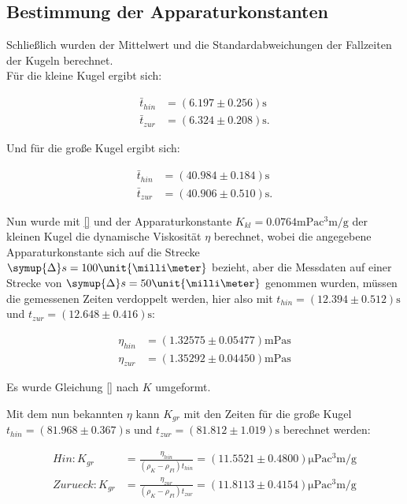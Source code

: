 \subsection{Bestimmung der Apparaturkonstanten}

Schließlich wurden der Mittelwert und die Standardabweichungen der Fallzeiten der Kugeln berechnet.\\
Für die kleine Kugel ergibt sich:

\begin{align*}
  \bar{t}_{hin} &=(6.197\pm 0.256)\unit{\second}\\
  \bar{t}_{zur} &=(6.324\pm 0.208)\unit{\second}.
\end{align*}

Und für die große Kugel ergibt sich:

\begin{align*}
  \bar{t}_{hin} &=(40.984\pm 0.184)\unit{\second}\\
  \bar{t}_{zur} &=(40.906\pm 0.510)\unit{\second}.
\end{align*}

Nun wurde mit \eqref{} und der Apparaturkonstante $K_{kl} = 0.0764\unit{\milli\pascal\cubic\centi\meter\per\gram}$
der kleinen Kugel die dynamische Viskosität $\eta$ berechnet, wobei die angegebene Apparaturkonstante sich auf die Strecke
$\symup{\Delta}s = 100\unit{\milli\meter}$ bezieht, aber die Messdaten auf einer Strecke von $\symup{\Delta}s = 50\unit{\milli\meter}$ genommen wurden,
müssen die gemessenen Zeiten verdoppelt werden, hier also mit $t_{hin} = (12.394\pm 0.512)\unit{\second}$ und $t_{zur} = (12.648\pm 0.416)\unit{\second}$:


\begin{align*}
  \eta_{hin} &= (1.32575\pm 0.05477)\unit{\milli\pascal\second}\\
  \eta_{zur} &= (1.35292\pm 0.04450)\unit{\milli\pascal\second}
\end{align*}

Es wurde Gleichung \eqref{} nach $K$ umgeformt. 

Mit dem nun bekannten $\eta$ kann $K_{gr}$ mit
den Zeiten für die große Kugel $t_{hin} = (81.968\pm 0.367)\unit{\second}$ und $t_{zur} = (81.812\pm 1.019)\unit{\second}$ berechnet werden:

\begin{align*}
  Hin : K_{gr} &= \frac{\eta_{hin}}{(\rho_K-\rho_{Fl})t_{hin}} = (11.5521\pm 0.4800)\unit{\micro\pascal\cubic\centi\meter\per\gram}\\
  Zurueck : K_{gr} &= \frac{\eta_{zur}}{(\rho_K-\rho_{Fl})t_{zur}} = (11.8113\pm 0.4154)\unit{\micro\pascal\cubic\centi\meter\per\gram}
\end{align*}


